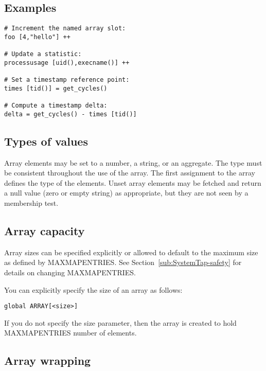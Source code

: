\documentclass[twoside,english]{article}
\newenvironment{vindent}
{\begin{list}{}{\setlength{\listparindent}{6pt}}
\item[]}
{\end{list}}
\begin{document}
\subsection{Examples}

\begin{vindent}
\begin{verbatim}
# Increment the named array slot:
foo [4,"hello"] ++

# Update a statistic:
processusage [uid(),execname()] ++

# Set a timestamp reference point:
times [tid()] = get_cycles()

# Compute a timestamp delta:
delta = get_cycles() - times [tid()]
\end{verbatim}
\end{vindent}

\subsection{Types of values}

Array elements may be set to a number, a string, or an aggregate.
The type must be consistent
throughout the use of the array. The first assignment to the array defines
the type of the elements. Unset array elements may be fetched and return
a null value (zero or empty string) as appropriate, but they are not seen
by a membership test.


\subsection{Array capacity}

Array sizes can be specified explicitly or allowed to default to the maximum
size as defined by MAXMAPENTRIES. See Section~\ref{sub:SystemTap-safety}
for details on changing MAXMAPENTRIES.

You can explicitly specify the size of an array as follows:

\begin{vindent}
\begin{verbatim}
global ARRAY[<size>]
\end{verbatim}
\end{vindent}
If you do not specify the size parameter, then the array is created to hold
MAXMAPENTRIES number of elements.

\subsection{Array wrapping\label{sub:Array-Wrapping}}
\end{document}
